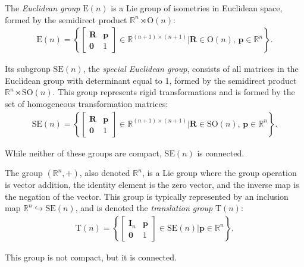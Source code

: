 \begin{example}\label{ex:euclidean-group-special-euclidean-group}
    The \emph{Euclidean group} $\text{E}(n)$ is a Lie group of isometries in Euclidean space, formed by the semidirect product $\mathbb{R}^n \rtimes \text{O}(n)$:
    \begin{align}
        \text{E}(n) = \left\{\begin{bmatrix}
            \mathbf{R} & \mathbf{p} \\ \mathbf{0} & 1
        \end{bmatrix} \in \mathbb{R}^{(n+1)\times(n+1)} | \mathbf{R}\in\text{O}(n),\, \mathbf{p}\in\mathbb{R}^n\right\}.
    \end{align}

    Its subgroup $\text{SE}(n)$, the \emph{special Euclidean group}, consists of all matrices in the Euclidean group with determinant equal to 1, formed by the semidirect product $\mathbb{R}^n\rtimes \text{SO}(n)$. This group represents rigid transformations and is formed by the set of homogeneous transformation matrices:
    \begin{align}
        \text{SE}(n) = \left\{\begin{bmatrix}
            \mathbf{R} & \mathbf{p} \\ \mathbf{0} & 1
        \end{bmatrix} \in \mathbb{R}^{(n+1)\times(n+1)} | \mathbf{R}\in\text{SO}(n),\, \mathbf{p}\in\mathbb{R}^n\right\}.
    \end{align}

    While neither of these groups are compact, $\text{SE}(n)$ is connected.
\end{example}
\begin{example}\label{ex:translation-group}
    The group $(\mathbb{R}^n,+)$, also denoted $\mathbb{R}^n$, is a Lie group where the group operation is vector addition, the identity element is the zero vector, and the inverse map is the negation of the vector. This group is typically represented by an inclusion map $\mathbb{R}^n \hookrightarrow \text{SE}(n)$, and is denoted the \emph{translation group} $\text{T}(n)$:
    \begin{align}
        \text{T}(n) = \left\{\begin{bmatrix}
            \mathbf{I}_n & \mathbf{p} \\ \mathbf{0} & 1
        \end{bmatrix} \in \text{SE}(n) | \mathbf{p}\in\mathbb{R}^n\right\}.
    \end{align}

    This group is not compact, but it is connected.
\end{example}
